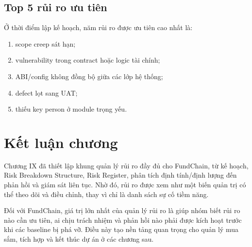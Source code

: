 \subsection{Top 5 rủi ro ưu tiên}

Ở thời điểm lập kế hoạch, năm rủi ro được ưu tiên cao nhất là:

\begin{enumerate}
  \item scope creep sát hạn;
  \item vulnerability trong contract hoặc logic tài chính;
  \item ABI/config không đồng bộ giữa các lớp hệ thống;
  \item defect lọt sang UAT;
  \item thiếu key person ở module trọng yếu.
\end{enumerate}

\section{Kết luận chương}

Chương IX đã thiết lập khung quản lý rủi ro đầy đủ cho FundChain, từ kế hoạch, Risk Breakdown Structure, Risk Register, phân tích định tính/định lượng đến phản hồi và giám sát liên tục. Nhờ đó, rủi ro được xem như một biến quản trị có thể theo dõi và điều chỉnh, thay vì chỉ là danh sách sự cố tiềm năng.

Đối với FundChain, giá trị lớn nhất của quản lý rủi ro là giúp nhóm biết rủi ro nào cần ưu tiên, ai chịu trách nhiệm và phản hồi nào phải được kích hoạt trước khi các baseline bị phá vỡ. Điều này tạo nền tảng quan trọng cho quản lý mua sắm, tích hợp và kết thúc dự án ở các chương sau.
